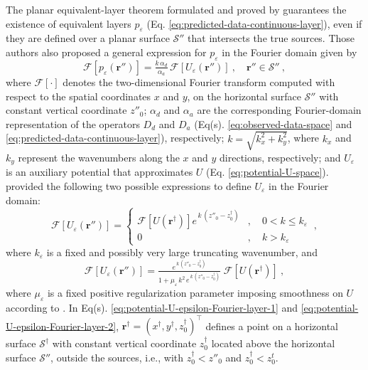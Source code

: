 The planar equivalent-layer theorem formulated and proved by \cite{oliveirajr_etal2026_1} 
guarantees the existence of equivalent layers $p_{\varepsilon}$ 
(Eq. \ref{eq:predicted-data-continuous-layer}), even 
if they are defined over a planar surface $\mathcal{S}''$ that intersects the true sources.
Those authors also proposed a general expression for $p_{\varepsilon}$ in the Fourier domain 
given by
\begin{equation}
	\mathcal{F} [ p_{\varepsilon}(\mathbf{r}'') ] =
	\tfrac{k \, \alpha_{d}}{\alpha_{a}} \,
	\mathcal{F} [ U_{\varepsilon}(\mathbf{r}'') ] \: ,
	\quad \mathbf{r}'' \in \mathcal{S}'' \: ,
	\label{eq:p-Fourier}
\end{equation}
where $\mathcal{F} [ \cdot ]$ denotes the two-dimensional Fourier transform computed 
with respect to the spatial coordinates $x$ and $y$, on 
the horizontal surface $\mathcal{S}''$ with constant vertical coordinate $z''_{0}$;
$\alpha_{d}$ and $\alpha_{a}$ are the corresponding Fourier-domain 
representation of the operators $D_{d}$ and $D_{a}$ (Eq(s). \ref{eq:observed-data-space}
and \ref{eq:predicted-data-continuous-layer}),
respectively; $k = \sqrt{k_{x}^{2} + k_{y}^{2}}$, where $k_{x}$ and $k_{y}$ represent the 
wavenumbers along the $x$ and $y$ directions, respectively; and $U_{\varepsilon}$ is an 
auxiliary potential that approximates $U$ (Eq. \ref{eq:potential-U-space}).
\cite{oliveirajr_etal2026_1} provided the following two possible expressions to define 
$U_{\varepsilon}$ in the Fourier domain:
\begin{equation}
	\mathcal{F} \left[ U_{\varepsilon}(\mathbf{r}'') \right] = 
	\begin{cases}
		\mathcal{F} \left[ U(\mathbf{r}^{\dagger}) \right] 
		e^{\, k \, (z''_{0} - z^{\dagger}_{0})} & , 
		\quad 0 < k \le k_{\varepsilon} \\
		0 & , \quad k > k_{\varepsilon} 
	\end{cases} \: ,
	\label{eq:potential-U-epsilon-Fourier-layer-1}
\end{equation}
where $k_{\varepsilon}$ is a fixed and possibly very large truncating wavenumber, and
\begin{equation}
	\mathcal{F} \left[ U_{\varepsilon}(\mathbf{r}'') \right] = 
	\tfrac{e^{\, k \, (z''_{0} - z^{\dagger}_{0})}}{1 + \mu_{\varepsilon} \, k^{2} \, e^{\, k \, (z''_{0} - z^{\dagger}_{0})}} \; 
	\mathcal{F} [ U(\mathbf{r}^{\dagger}) ] \: ,
	\label{eq:potential-U-epsilon-Fourier-layer-2}
\end{equation}
where $\mu_{\varepsilon}$ is a fixed positive regularization parameter imposing smoothness on 
$U$ according to \cite{pasteka_etal2012}. 
In Eq(s). \ref{eq:potential-U-epsilon-Fourier-layer-1} and 
\ref{eq:potential-U-epsilon-Fourier-layer-2},
$\mathbf{r}^{\dagger} = (x^{\dagger}, y^{\dagger}, z^{\dagger}_{0})^{\top}$ defines a point on 
a horizontal surface $\mathcal{S}^{\dagger}$ with constant vertical coordinate 
$z^{\dagger}_{0}$ located above the horizontal surface $\mathcal{S}''$, outside the sources, 
i.e., with $z^{\dagger}_{0} < z''_{0}$ and $z^{\dagger}_{0} < z^{t}_{0}$.

